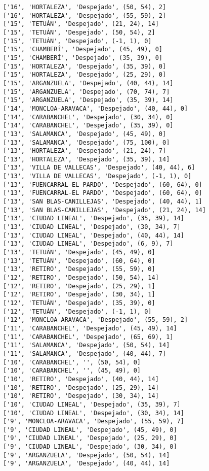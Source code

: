\documentclass[11pt]{article}
\begin{document}
\begin{Verbatim}[commandchars=\\\{\}]
['16', 'HORTALEZA', 'Despejado', (50, 54), 2]
['16', 'HORTALEZA', 'Despejado', (55, 59), 2]
['15', 'TETUÁN', 'Despejado', (21, 24), 14]
['15', 'TETUÁN', 'Despejado', (50, 54), 2]
['15', 'TETUÁN', 'Despejado', (-1, 1), 0]
['15', 'CHAMBERÍ', 'Despejado', (45, 49), 0]
['15', 'CHAMBERÍ', 'Despejado', (35, 39), 0]
['15', 'HORTALEZA', 'Despejado', (35, 39), 0]
['15', 'HORTALEZA', 'Despejado', (25, 29), 0]
['15', 'ARGANZUELA', 'Despejado', (40, 44), 14]
['15', 'ARGANZUELA', 'Despejado', (70, 74), 7]
['15', 'ARGANZUELA', 'Despejado', (35, 39), 14]
['14', 'MONCLOA-ARAVACA', 'Despejado', (40, 44), 0]
['14', 'CARABANCHEL', 'Despejado', (30, 34), 0]
['14', 'CARABANCHEL', 'Despejado', (35, 39), 0]
['13', 'SALAMANCA', 'Despejado', (45, 49), 0]
['13', 'SALAMANCA', 'Despejado', (75, 100), 0]
['13', 'HORTALEZA', 'Despejado', (21, 24), 7]
['13', 'HORTALEZA', 'Despejado', (35, 39), 14]
['13', 'VILLA DE VALLECAS', 'Despejado', (40, 44), 6]
['13', 'VILLA DE VALLECAS', 'Despejado', (-1, 1), 0]
['13', 'FUENCARRAL-EL PARDO', 'Despejado', (60, 64), 0]
['13', 'FUENCARRAL-EL PARDO', 'Despejado', (60, 64), 0]
['13', 'SAN BLAS-CANILLEJAS', 'Despejado', (40, 44), 1]
['13', 'SAN BLAS-CANILLEJAS', 'Despejado', (21, 24), 14]
['13', 'CIUDAD LINEAL', 'Despejado', (35, 39), 14]
['13', 'CIUDAD LINEAL', 'Despejado', (30, 34), 7]
['13', 'CIUDAD LINEAL', 'Despejado', (40, 44), 14]
['13', 'CIUDAD LINEAL', 'Despejado', (6, 9), 7]
['13', 'TETUÁN', 'Despejado', (45, 49), 0]
['13', 'TETUÁN', 'Despejado', (60, 64), 0]
['13', 'RETIRO', 'Despejado', (55, 59), 0]
['12', 'RETIRO', 'Despejado', (50, 54), 14]
['12', 'RETIRO', 'Despejado', (25, 29), 1]
['12', 'RETIRO', 'Despejado', (30, 34), 1]
['12', 'TETUÁN', 'Despejado', (35, 39), 0]
['12', 'TETUÁN', 'Despejado', (-1, 1), 0]
['12', 'MONCLOA-ARAVACA', 'Despejado', (55, 59), 2]
['11', 'CARABANCHEL', 'Despejado', (45, 49), 14]
['11', 'CARABANCHEL', 'Despejado', (65, 69), 1]
['11', 'SALAMANCA', 'Despejado', (50, 54), 14]
['11', 'SALAMANCA', 'Despejado', (40, 44), 7]
['10', 'CARABANCHEL', '', (50, 54), 0]
['10', 'CARABANCHEL', '', (45, 49), 0]
['10', 'RETIRO', 'Despejado', (40, 44), 14]
['10', 'RETIRO', 'Despejado', (25, 29), 14]
['10', 'RETIRO', 'Despejado', (30, 34), 14]
['10', 'CIUDAD LINEAL', 'Despejado', (35, 39), 7]
['10', 'CIUDAD LINEAL', 'Despejado', (30, 34), 14]
['9', 'MONCLOA-ARAVACA', 'Despejado', (55, 59), 7]
['9', 'CIUDAD LINEAL', 'Despejado', (45, 49), 0]
['9', 'CIUDAD LINEAL', 'Despejado', (25, 29), 0]
['9', 'CIUDAD LINEAL', 'Despejado', (30, 34), 0]
['9', 'ARGANZUELA', 'Despejado', (50, 54), 14]
['9', 'ARGANZUELA', 'Despejado', (40, 44), 14]

\end{Verbatim}
\end{document}
